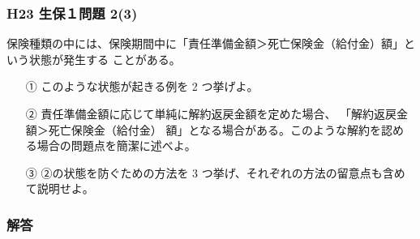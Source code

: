 \documentclass[report,gutter=10mm,fore-edge=10mm,uplatex,dvipdfmx]{jlreq}
\begin{document}
\subsubsection{H23 生保１問題 2(3)}
保険種類の中には、保険期間中に「責任準備金額＞死亡保険金（給付金）額」という状態が発生する
ことがある。
\begin{itemize}
 \item [①] このような状態が起きる例を 2 つ挙げよ。
 \item [②] 責任準備金額に応じて単純に解約返戻金額を定めた場合、
「解約返戻金額＞死亡保険金（給付金）
額」となる場合がある。このような解約を認める場合の問題点を簡潔に述べよ。
 \item [③] ②の状態を防ぐための方法を 3 つ挙げ、それぞれの方法の留意点も含めて説明せよ。
\end{itemize}
\subsubsection{解答}
\end{document}
